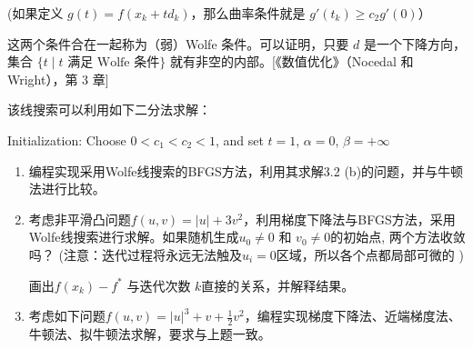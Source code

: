 \documentclass[12pt,a4paper]{article}
\begin{document}
(如果定义 $g(t)=f(x_k+td_k)$，那么曲率条件就是 $g'(t_k)\geq c_2 g'(0)$）

这两个条件合在一起称为（弱）Wolfe 条件。可以证明，只要 $d$ 是一个下降方向，集合 $\{t\;|\; t \text{ 满足 Wolfe 条件}\}$ 就有非空的内部。[《数值优化》（Nocedal 和 Wright），第 3 章]

该线搜索可以利用如下二分法求解：


\begin{algorithm}[H]
	\SetAlgoLined
	
	Initialization: Choose $0<c_1<c_2<1$, and set $t=1$, $\alpha=0$, $\beta=+\infty$\;
\end{algorithm}

\begin{enumerate}
	\item[(a)] 编程实现采用Wolfe线搜索的BFGS方法，利用其求解3.2 (b)的问题，并与牛顿法进行比较。
	
	\item[(b)] 考虑非平滑凸问题$f(u,v)=|u|+3v^2$，利用梯度下降法与BFGS方法，采用Wolfe线搜索进行求解。如果随机生成$u_0 \neq 0$ 和 $v_0 \neq 0$的初始点, 两个方法收敛吗？ (注意：迭代过程将永远无法触及$u_i=0$区域，所以各个点都局部可微的 )
	
	画出$f(x_k)- f^*$ 与迭代次数 $k$直接的关系，并解释结果。
	
	\item[(c)] 考虑如下问题$f(u,v)=|u|^3+v+\frac{1}{2}v^2$，编程实现梯度下降法、近端梯度法、牛顿法、拟牛顿法求解，要求与上题一致。
	
\end{enumerate}
\end{document}
